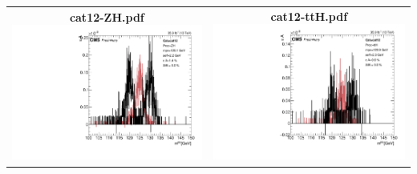 \begin{longtable}{|c|c|}
{}
 \\
\hline
\parbox{0.49\textwidth}{
\centering
{\bfseries cat12-ZH.pdf}
\includegraphics[width=.49\textwidth]{figures/signal_model/AppendixBdt/signal/Bdt_Rochester/cat12_ZH.pdf}
}
 & \parbox{0.49\textwidth}{
\centering
{\bfseries cat12-ttH.pdf}
\includegraphics[width=.49\textwidth]{figures/signal_model/AppendixBdt/signal/Bdt_Rochester/cat12_ttH.pdf}
}
 \\
\hline
\end{longtable}
